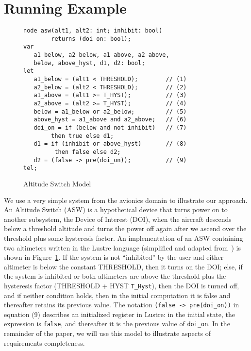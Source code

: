 \section{Running Example}
\label{sec:example}


\begin{figure}[t]
\centering
{\smaller
\begin{verbatim}
node asw(alt1, alt2: int; inhibit: bool)
        returns (doi_on: bool);
var
   a1_below, a2_below, a1_above, a2_above,
   below, above_hyst, d1, d2: bool;
let
   a1_below = (alt1 < THRESHOLD);        // (1)
   a2_below = (alt2 < THRESHOLD);        // (2)
   a1_above = (alt1 >= T_HYST);          // (3)
   a2_above = (alt2 >= T_HYST);          // (4)
   below = a1_below or a2_below;         // (5)
   above_hyst = a1_above and a2_above;   // (6)
   doi_on = if (below and not inhibit)   // (7)
        then true else d1;
   d1 = if (inhibit or above_hyst)       // (8)
         then false else d2;
   d2 = (false -> pre(doi_on));          // (9)
tel;
\end{verbatim}
}
\vspace{-0.1in}
\caption{Altitude Switch Model}
\vspace{-0.27in}
\label{fig:asw}
\end{figure}

We use a very simple system from the avionics domain to illustrate our approach. An Altitude Switch (ASW) is a hypothetical device that turns power on to another subsystem, the Device of Interest (DOI), when the aircraft descends below a threshold altitude and turns the power off again after we ascend over the threshold plus some hysteresis factor.  An implementation of an ASW containing two altimeters written in the Lustre language (simplified and adapted from~\cite{HCW02:ase-deviation}) is shown in Figure~\ref{fig:asw}.  If the system is not ``inhibited'' by the user and either altimeter is below the constant THRESHOLD, then it turns on the DOI; else, if the system is inhibited or both altimeters are above the threshold plus the hysteresis
factor {\small{(THRESHOLD + HYST \texttt{T\_Hyst})}}, then the DOI is turned off, and if neither condition holds, then in the initial computation it is false and thereafter retains its previous value.  The notation {\small{\texttt{(false -> pre(doi\_on))}}} in equation (9) describes an initialized register in Lustre: in the initial state, the expression is {\small{\texttt{false}}}, and thereafter it is the previous value of {\small{\texttt{doi\_on}}}.  In the remainder of the paper, we will use this model to illustrate aspects of requirements completeness.  %


